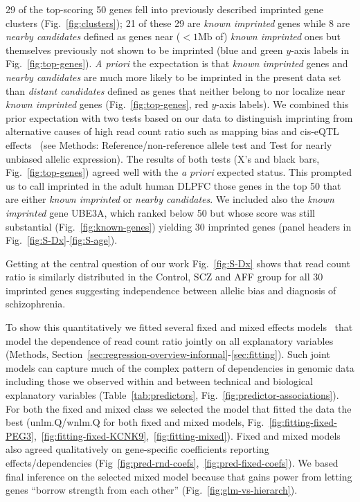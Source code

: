 \documentclass[letterpaper]{article}
\begin{document}
29 of the top-scoring 50 genes fell into previously described imprinted gene
clusters (Fig.~\ref{fig:clusters}); 21 of these 29 are \emph{known imprinted}
genes while 8 are \emph{nearby candidates} defined as genes near
(\(<1\mathrm{Mb}\) of) \emph{known imprinted} ones but themselves previously
not shown to be imprinted (blue and green \(y\)-axis labels in
Fig.~\ref{fig:top-genes}).   \emph{A priori} the expectation is that
\emph{known imprinted} genes and \emph{nearby candidates} are much more likely
to be imprinted  in the present data set than \emph{distant candidates}
defined as genes that neither belong to nor localize near \emph{known
imprinted} genes (Fig.~\ref{fig:top-genes}, red \(y\)-axis labels).  We
combined this prior expectation with two tests based on our data to
distinguish imprinting from alternative causes of high read count ratio such
as mapping bias and cis-eQTL effects~\cite{Babak2015} (see Methods:
Reference/non-reference allele test and Test for nearly unbiased allelic
expression).  The results of both tests (X's and black bars,
Fig.~\ref{fig:top-genes}) agreed well with the \emph{a priori} expected
status.  This prompted us to call imprinted in the adult human DLPFC those
genes in the top 50 that are either
\emph{known imprinted} or \emph{nearby candidates}.
We included also the \emph{known imprinted} gene UBE3A, which ranked below 50
but whose score was still substantial (Fig.~\ref{fig:known-genes}) yielding 30
imprinted genes (panel headers in Fig.~\ref{fig:S-Dx}-\ref{fig:S-age}).

Getting at the central question of our work Fig.~\ref{fig:S-Dx} shows
that read count ratio is similarly distributed in the Control, SCZ and AFF
group for all 30 imprinted genes suggesting independence between allelic bias and diagnosis of
schizophrenia.

To show this quantitatively we fitted several fixed and mixed effects models~\cite{Hoffman2016}
that model the dependence of read count ratio jointly on all explanatory
variables (Methods,
Section~\ref{sec:regression-overview-informal}-\ref{sec:fitting}).  Such joint
models can capture much of the complex pattern of dependencies in genomic data
including those we observed within and between technical and biological
explanatory variables (Table~\ref{tab:predictors},
Fig.~\ref{fig:predictor-associations}).  For both the fixed and mixed class we
selected the model that fitted the data the best (unlm.Q/wnlm.Q for both fixed
and mixed models,
Fig.~\ref{fig:fitting-fixed-PEG3},~\ref{fig:fitting-fixed-KCNK9},~\ref{fig:fitting-mixed}).
Fixed and mixed models also agreed qualitatively on gene-specific coefficients
reporting effects/dependencies
(Fig~\ref{fig:pred-rnd-coefs},~\ref{fig:pred-fixed-coefs}). We based final
inference on the selected mixed model because that gains power from letting
genes ``borrow strength from each other'' (Fig.~\ref{fig:glm-vs-hierarch}).
\end{document}
